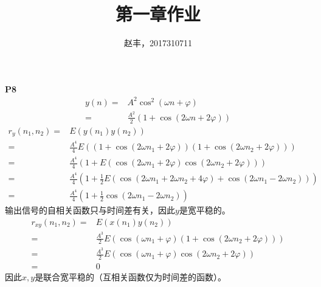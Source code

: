 \documentclass{article}
\begin{document}
\title{第一章作业}
\author{赵丰，2017310711}
\maketitle
\textbf{P8}
\begin{align}
y(n)=&A^2\cos^2(\omega n+\varphi)\\
=&\frac{A^2}{2}\left(1+\cos(2\omega n+2\varphi)\right)
\end{align}
\begin{align}
r_y(n_1,n_2)=&E\left(y(n_1)y(n_2)\right)\\
=&\frac{A^4}{4}E\left((1+\cos(2\omega n_1+2\varphi))(1+\cos(2\omega n_2+2\varphi))\right)\\
=&\frac{A^4}{4}(1+E(\cos(2\omega n_1+2\varphi)\cos(2\omega n_2+2\varphi)))\\
=&\frac{A^4}{4}(1+\frac{1}{2}E(\cos(2\omega n_1+2\omega n_2+4\varphi)+\cos(2\omega n_1-2\omega n_2)))\\
=&\frac{A^4}{4}(1+\frac{1}{2}\cos(2\omega n_1-2\omega n_2))
\end{align}
输出信号的自相关函数只与时间差有关，因此$y$是宽平稳的。
\begin{align}
r_{xy}(n_1,n_2)=&E\left(x(n_1)y(n_2)\right)\\
=&\frac{A^3}{2}E\left(\cos(\omega n_1+\varphi)(1+\cos(2\omega n_2+2\varphi))\right)\\
=&\frac{A^3}{2}E\left(\cos(\omega n_1+\varphi)\cos(2\omega n_2+2\varphi)\right)\\
=&0
\end{align}
因此$x,y$是联合宽平稳的（互相关函数仅为时间差的函数）。
\end{document}
